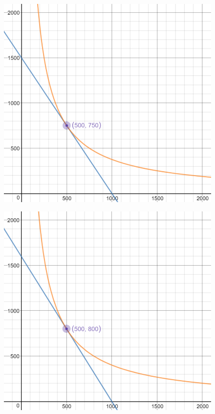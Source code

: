 \documentclass{article}
\begin{document}
\begin{enumerate}
        \begin{figure}[H]
            \centering
            \includegraphics[scale=0.8]{"Figure 2"}
        \end{figure}

        \begin{figure}[H]
            \centering
            \includegraphics[scale=0.8]{"Figure 3"}
        \end{figure}

\end{enumerate}
\end{document}
